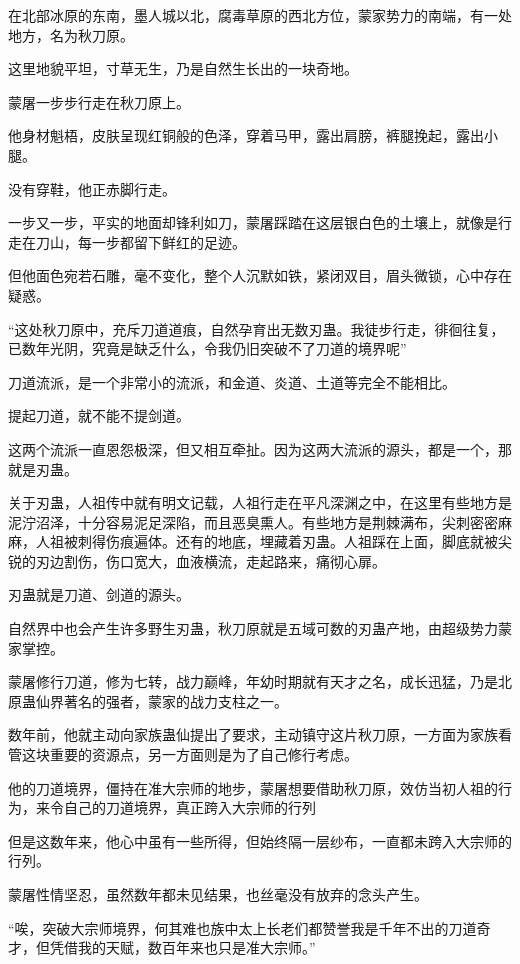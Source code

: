 
\begin{this_body}

在北部冰原的东南，墨人城以北，腐毒草原的西北方位，蒙家势力的南端，有一处地方，名为秋刀原。

这里地貌平坦，寸草无生，乃是自然生长出的一块奇地。

蒙屠一步步行走在秋刀原上。

他身材魁梧，皮肤呈现红铜般的色泽，穿着马甲，露出肩膀，裤腿挽起，露出小腿。

没有穿鞋，他正赤脚行走。

一步又一步，平实的地面却锋利如刀，蒙屠踩踏在这层银白色的土壤上，就像是行走在刀山，每一步都留下鲜红的足迹。

但他面色宛若石雕，毫不变化，整个人沉默如铁，紧闭双目，眉头微锁，心中存在疑惑。

“这处秋刀原中，充斥刀道道痕，自然孕育出无数刃蛊。我徒步行走，徘徊往复，已数年光阴，究竟是缺乏什么，令我仍旧突破不了刀道的境界呢”

刀道流派，是一个非常小的流派，和金道、炎道、土道等完全不能相比。

提起刀道，就不能不提剑道。

这两个流派一直恩怨极深，但又相互牵扯。因为这两大流派的源头，都是一个，那就是刃蛊。

关于刃蛊，人祖传中就有明文记载，人祖行走在平凡深渊之中，在这里有些地方是泥泞沼泽，十分容易泥足深陷，而且恶臭熏人。有些地方是荆棘满布，尖刺密密麻麻，人祖被刺得伤痕遍体。还有的地底，埋藏着刃蛊。人祖踩在上面，脚底就被尖锐的刃边割伤，伤口宽大，血液横流，走起路来，痛彻心扉。

刃蛊就是刀道、剑道的源头。

自然界中也会产生许多野生刃蛊，秋刀原就是五域可数的刃蛊产地，由超级势力蒙家掌控。

蒙屠修行刀道，修为七转，战力巅峰，年幼时期就有天才之名，成长迅猛，乃是北原蛊仙界著名的强者，蒙家的战力支柱之一。

数年前，他就主动向家族蛊仙提出了要求，主动镇守这片秋刀原，一方面为家族看管这块重要的资源点，另一方面则是为了自己修行考虑。

他的刀道境界，僵持在准大宗师的地步，蒙屠想要借助秋刀原，效仿当初人祖的行为，来令自己的刀道境界，真正跨入大宗师的行列

但是这数年来，他心中虽有一些所得，但始终隔一层纱布，一直都未跨入大宗师的行列。

蒙屠性情坚忍，虽然数年都未见结果，也丝毫没有放弃的念头产生。

“唉，突破大宗师境界，何其难也族中太上长老们都赞誉我是千年不出的刀道奇才，但凭借我的天赋，数百年来也只是准大宗师。”


\end{this_body}
